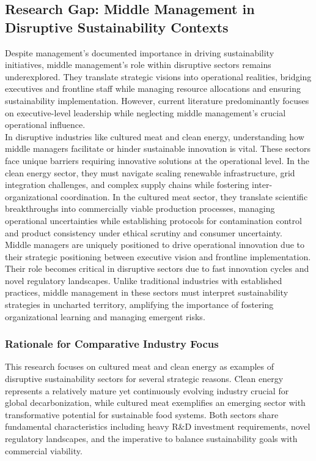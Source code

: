 	\subsection{Research Gap: Middle Management in Disruptive Sustainability Contexts}
	Despite management’s documented importance in driving sustainability initiatives, middle management’s role within disruptive sectors remains underexplored. They translate strategic visions into operational realities, bridging executives and frontline staff while managing resource allocations and ensuring sustainability implementation. However, current literature predominantly focuses on executive-level leadership while neglecting middle management’s crucial operational influence. \\
	
	In disruptive industries like cultured meat and clean energy, understanding how middle managers facilitate or hinder sustainable innovation is vital. These sectors face unique barriers requiring innovative solutions at the operational level. In the clean energy sector, they must navigate scaling renewable infrastructure, grid integration challenges, and complex supply chains while fostering inter-organizational coordination. In the cultured meat sector, they translate scientific breakthroughs into commercially viable production processes, managing operational uncertainties while establishing protocols for contamination control and product consistency under ethical scrutiny and consumer uncertainty. \\
	
	Middle managers are uniquely positioned to drive operational innovation due to their strategic positioning between executive vision and frontline implementation. Their role becomes critical in disruptive sectors due to fast innovation cycles and novel regulatory landscapes. Unlike traditional industries with established practices, middle management in these sectors must interpret sustainability strategies in uncharted territory, amplifying the importance of fostering organizational learning and managing emergent risks. \\
	
	\subsubsection{Rationale for Comparative Industry Focus}
	This research focuses on cultured meat and clean energy as examples of disruptive sustainability sectors for several strategic reasons. Clean energy represents a relatively mature yet continuously evolving industry crucial for global decarbonization, while cultured meat exemplifies an emerging sector with transformative potential for sustainable food systems. Both sectors share fundamental characteristics including heavy R\&D investment requirements, novel regulatory landscapes, and the imperative to balance sustainability goals with commercial viability. \\
	

